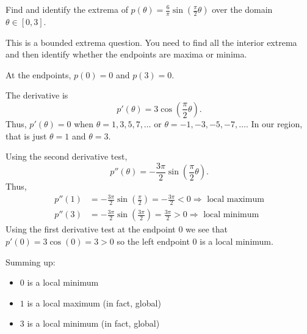 \documentclass{ximera}
\author{Emma Smith Zbarsky}
\begin{document}
\begin{exercise}

Find and identify the extrema of
$p(\theta) = \frac{6}{\pi}\sin\left(\frac{\pi}{2}\theta\right)$ over the
domain $\theta \in [0,3]$.


\begin{hint}
This is a bounded extrema question. You need to find all the interior
extrema and then identify whether the endpoints are maxima or minima.
\end{hint}


\begin{hint}
At the endpoints, $p(0)=0$ and $p(3) = 0$.

The derivative is
\[p'(\theta) = 3\cos\left(\frac{\pi}{2}\theta\right).\] Thus,
$p'(\theta)  = 0$ when $\theta = 1, 3, 5, 7, \ldots$ or
$\theta = -1, -3, -5, -7, \ldots $. In our region, that is just
$\theta=1$ and $\theta=3$.

Using the second derivative test,
\[p''(\theta) = -\frac{3\pi}{2}\sin\left(\frac{\pi}{2}\theta\right).\]
Thus, \begin{align*}
p''(1) &= -\frac{3\pi}{2}\sin\left(\frac{\pi}{2}\right) = -\frac{3\pi}{2} < 0 \Rightarrow \mbox{ local maximum} \\
p''(3) &= -\frac{3\pi}{2}\sin\left(\frac{3\pi}{2}\right) = \frac{3\pi}{2} > 0 \Rightarrow \mbox{ local minimum}
\end{align*} Using the first derivative test at the endpoint $0$ we
see that $p'(0)= 3\cos(0) = 3 > 0$ so the left endpoint $0$ is a local
minimum.

Summing up:

\begin{itemize}
\item
  $0$ is a local minimum
\item
  $1$ is a local maximum (in fact, global)
\item
  $3$ is a local minimum (in fact, global)
\end{itemize}
\end{hint}


\begin{multipleChoice}
\end{multipleChoice}
\end{exercise}
\end{document}

